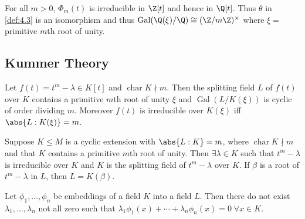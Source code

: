 \documentclass{article}
\DeclareMathOperator{\chara}{char}
\DeclareMathOperator{\Gal}{Gal}
\begin{document}
\begin{nthm}\label{thm:4.8}
    For all $m > 0$, $\Phi_m(t)$ is irreducible in $\Z[t]$ and hence in $\Q[t]$.
    Thus $\theta$ in \cref{def:4.3} is an isomorphism and thus $\Gal(\Q(\xi)/\Q) \cong (\Z/m\Z)^\times$ where $\xi =$ primitive $m$th root of unity.
\end{nthm}




\subsection{Kummer Theory}






\begin{nthm}\label{thm:4.10}
    Let $f(t) = t^m - \lambda \in K[t]$ and $\chara K \nmid m$.
    Then the splitting field $L$ of $f(t)$ over $K$ contains a primitive $m$th root of unity $\xi$ and $\Gal(L/K(\xi))$ is cyclic of order dividing $m$.
    Moreover $f(t)$ is irreducible over $K(\xi)$ iff $\abs{L:K(\xi)} = m$.
\end{nthm}





\begin{nthm}\label{thm:4.11}
    Suppose $K \leq M$ is a cyclic extension with $\abs{L:K} = m$, where $\chara K \nmid m$ and that $K$ contains a primitive $m$th root of unity.
    Then $\exists \lambda \in K$ such that $t^m - \lambda$ is irreducible over $K$ and $K$ is the splitting field of $t^m - \lambda$ over $K$.
    If $\beta$ is a root of $t^m - \lambda$ in $L$, then $L = K(\beta)$.
\end{nthm}


\begin{nlemma}\label{lem:4.13}
    Let $\phi_1, \dotsc, \phi_n$ be embeddings of a field $K$ into a field $L$.
    Then there do not exist $\lambda_1, \dotsc, \lambda_n$ not all zero such that $\lambda_1 \phi_1(x) + \dotsb + \lambda_n \phi_n(x) = 0 \; \forall x \in K$.
\end{nlemma}



\end{document}
